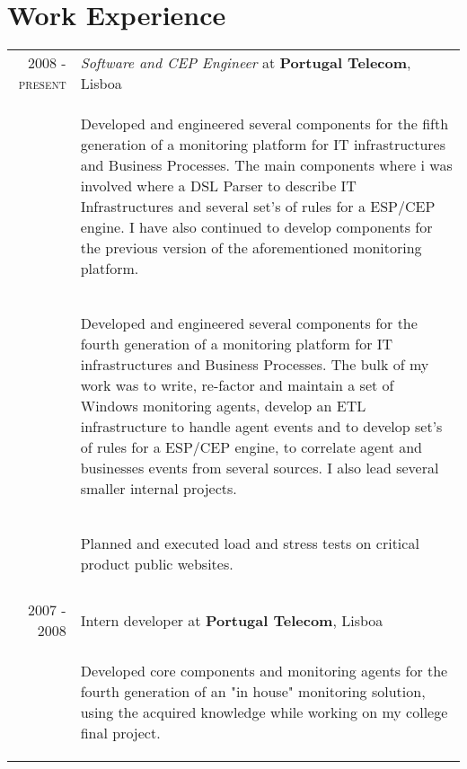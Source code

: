 \documentclass[a4paper,10pt]{article}
\begin{document}
\section{Work Experience}
\begin{tabular}{rp{11cm}}
  \textsc{2008 - present} & \emph{Software and CEP Engineer} at \textbf{Portugal Telecom}, Lisboa\\ 
  & \begin{compactitem} 
     \item Developed and engineered several components for the fifth generation of a monitoring platform for IT infrastructures and Business Processes. The main components where i was involved
     where a DSL Parser to describe IT Infrastructures and several set's of rules for a ESP/CEP engine. I have also continued to develop components for the previous version of the aforementioned
     monitoring platform.
     \end{compactitem}\vspace{-1em} \\
  & \begin{compactitem} 
     \item Developed and engineered several components for the fourth generation of a monitoring platform for IT infrastructures and Business Processes.
     The bulk of my work was to write, re-factor and maintain a set of Windows monitoring agents, develop an ETL infrastructure to handle agent events and to develop set's of rules for a ESP/CEP 
     engine,  to correlate agent and businesses events from several sources. I also lead several smaller internal projects.
     \end{compactitem}\vspace{-1em} \\
  & \begin{compactitem} 
     \item Planned and executed load and stress tests on critical product public websites.
     \end{compactitem}\vspace{-1em} \\
\multicolumn{2}{c}{} \\
  \textsc{2007 - 2008} & Intern developer at \textbf{Portugal Telecom}, Lisboa\\ 
   & \begin{compactitem}
   \item Developed core components and monitoring agents for the fourth generation of an "in house" monitoring solution, using the acquired knowledge while working on my college final project.

\end{compactitem}
\end{tabular}
\end{document}
